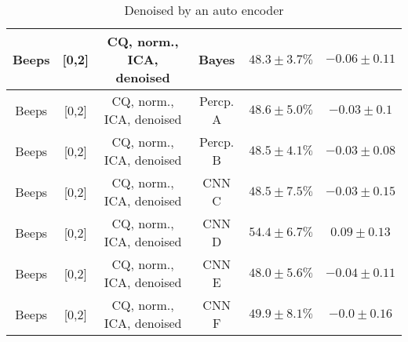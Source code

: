 \begin{table}[!htb]
{\begin{tabular}{c|c|c|c|c|c}
    \hline
    Beeps               & [0,2]                                         & \scriptsize{CQ, norm., ICA, denoised}      & Bayes                 &  $48.3 \pm 3.7\%$     & $-0.06 \pm 0.11$\\  
    \hline
    Beeps               & [0,2]                                         & \scriptsize{CQ, norm., ICA, denoised}      & Percp. A              &  $48.6 \pm 5.0\%$     & $-0.03 \pm 0.1$\\    
    \hline
    Beeps               & [0,2]                                         & \scriptsize{CQ, norm., ICA, denoised}      & Percp. B              &  $48.5 \pm 4.1\%$     & $-0.03 \pm 0.08$\\  
    \hline
    Beeps               & [0,2]                                         & \scriptsize{CQ, norm., ICA, denoised}      & CNN C                 &  $48.5 \pm 7.5\%$     & $-0.03 \pm 0.15$\\  
    \hline
    Beeps               & [0,2]                                         & \scriptsize{CQ, norm., ICA, denoised}      & CNN D                 &  $54.4 \pm 6.7\%$     & $0.09 \pm 0.13$\\  
    \hline
    Beeps               & [0,2]                                         & \scriptsize{CQ, norm., ICA, denoised}      & CNN E                 &  $48.0 \pm 5.6\%$     & $-0.04 \pm 0.11$\\ 
    \hline
    Beeps               & [0,2]                                         & \scriptsize{CQ, norm., ICA, denoised}      & CNN F                 &  $49.9 \pm 8.1\%$     & $-0.0 \pm 0.16$\\  
    \hline
\end{tabular}
}
\caption{Denoised by an auto encoder}
\label{tab:sound-denoised-app}
\end{table}